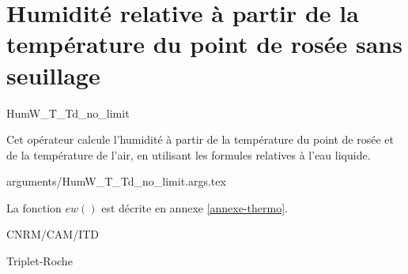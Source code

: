 %
\section{Humidit\'e relative \`a partir de la temp\'erature du point
de ros\'ee sans seuillage}

 {\sf HumW\_T\_Td\_no\_limit}

Cet op\'erateur calcule l'humidit\'e \`a partir de la temp\'erature 
du point de ros\'ee et de la temp\'erature de l'air, en utilisant les
formules relatives \`a l'eau liquide. 

\bigskip
 {arguments/HumW_T_Td_no_limit.args.tex}





La fonction $ew()$ est d\'ecrite en annexe
\ref{annexe-thermo}.

CNRM/CAM/ITD

Triplet-Roche \cite{Triplet-Roche}
